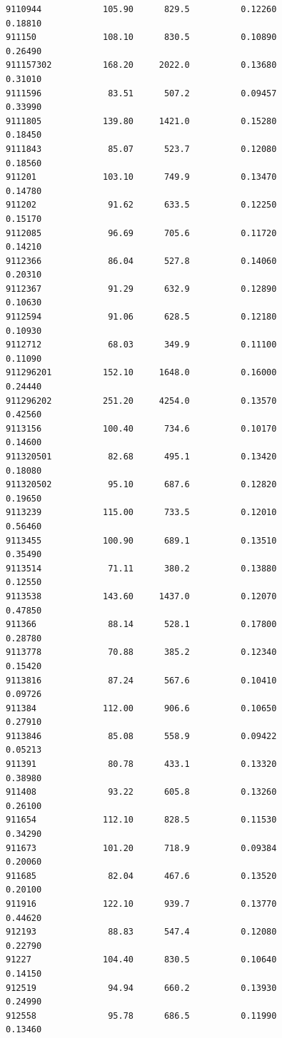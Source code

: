 \documentclass[
  letterpaper,
  DIV=11,
  numbers=noendperiod]{scrartcl}
\begin{document}
\begin{verbatim}
9110944            105.90      829.5          0.12260           0.18810
911150             108.10      830.5          0.10890           0.26490
911157302          168.20     2022.0          0.13680           0.31010
9111596             83.51      507.2          0.09457           0.33990
9111805            139.80     1421.0          0.15280           0.18450
9111843             85.07      523.7          0.12080           0.18560
911201             103.10      749.9          0.13470           0.14780
911202              91.62      633.5          0.12250           0.15170
9112085             96.69      705.6          0.11720           0.14210
9112366             86.04      527.8          0.14060           0.20310
9112367             91.29      632.9          0.12890           0.10630
9112594             91.06      628.5          0.12180           0.10930
9112712             68.03      349.9          0.11100           0.11090
911296201          152.10     1648.0          0.16000           0.24440
911296202          251.20     4254.0          0.13570           0.42560
9113156            100.40      734.6          0.10170           0.14600
911320501           82.68      495.1          0.13420           0.18080
911320502           95.10      687.6          0.12820           0.19650
9113239            115.00      733.5          0.12010           0.56460
9113455            100.90      689.1          0.13510           0.35490
9113514             71.11      380.2          0.13880           0.12550
9113538            143.60     1437.0          0.12070           0.47850
911366              88.14      528.1          0.17800           0.28780
9113778             70.88      385.2          0.12340           0.15420
9113816             87.24      567.6          0.10410           0.09726
911384             112.00      906.6          0.10650           0.27910
9113846             85.08      558.9          0.09422           0.05213
911391              80.78      433.1          0.13320           0.38980
911408              93.22      605.8          0.13260           0.26100
911654             112.10      828.5          0.11530           0.34290
911673             101.20      718.9          0.09384           0.20060
911685              82.04      467.6          0.13520           0.20100
911916             122.10      939.7          0.13770           0.44620
912193              88.83      547.4          0.12080           0.22790
91227              104.40      830.5          0.10640           0.14150
912519              94.94      660.2          0.13930           0.24990
912558              95.78      686.5          0.11990           0.13460

\end{verbatim}
\end{document}
